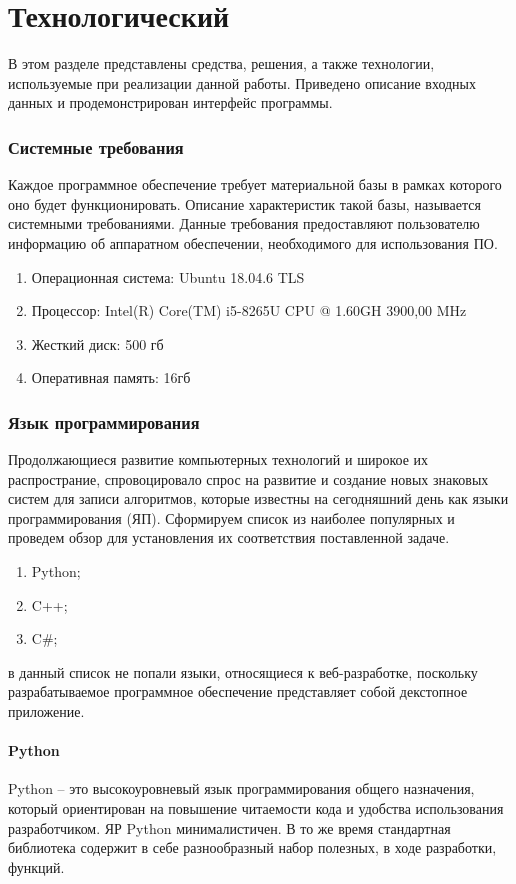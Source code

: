 \chapter{Технологический}
В этом разделе представлены средства, решения, а также технологии, используемые при реализации данной работы.
Приведено описание входных данных и продемонстрирован интерфейс программы.

\subsection{Системные требования}
Каждое программное обеспечение требует материальной базы в рамках которого оно будет функционировать.
Описание характеристик такой базы, называется системными требованиями.
Данные требования предоставляют пользователю информацию об аппаратном обеспечении, необходимого для использования ПО.
\begin{enumerate}
	\item Операционная система: Ubuntu 18.04.6 TLS
	\item Процессор: Intel(R) Core(TM) i5-8265U CPU @ 1.60GH	3900,00 MHz	
	\item Жесткий диск: 500 гб
	\item Оперативная память: 16гб
\end{enumerate}

\subsection{Язык программирования}
Продолжающиеся развитие компьютерных технологий и широкое их распространие, спровоцировало спрос на развитие и создание новых знаковых систем для записи алгоритмов, которые известны на сегодняшний день как языки программирования (ЯП).
Сформируем список из наиболее популярных и проведем обзор для установления их соответствия поставленной задаче.
\begin{enumerate}
	\item Python;
	\item C++;
	\item C\#;
\end{enumerate}
в данный список не попали языки, относящиеся к веб-разработке, поскольку разрабатываемое программное обеспечение представляет собой декстопное приложение.

\subsubsection{Python}
Python –  это высокоуровневый язык программирования общего назначения, который ориентирован на повышение читаемости кода и удобства использования разработчиком. 
ЯР Python минималистичен. 
В то же время стандартная библиотека содержит в себе разнообразный набор полезных, в ходе разработки, функций.

